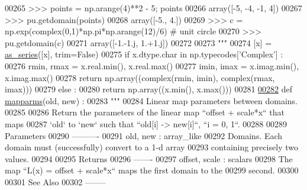 \begin{DoxyCode}
00265 \textcolor{stringliteral}{    >>> points = np.arange(4)**2 - 5; points}
00266 \textcolor{stringliteral}{    array([-5, -4, -1,  4])}
00267 \textcolor{stringliteral}{    >>> pu.getdomain(points)}
00268 \textcolor{stringliteral}{    array([-5.,  4.])}
00269 \textcolor{stringliteral}{    >>> c = np.exp(complex(0,1)*np.pi*np.arange(12)/6) # unit circle}
00270 \textcolor{stringliteral}{    >>> pu.getdomain(c)}
00271 \textcolor{stringliteral}{    array([-1.-1.j,  1.+1.j])}
00272 \textcolor{stringliteral}{}
00273 \textcolor{stringliteral}{    """}
00274     [x] = \hyperlink{namespacepyneb_1_1utils_1_1polyutils_a9c3751d438f0f75922155c7823fe2699}{as\_series}([x], trim=\textcolor{keyword}{False})
00275     \textcolor{keywordflow}{if} x.dtype.char \textcolor{keywordflow}{in} np.typecodes[\textcolor{stringliteral}{'Complex'}] :
00276         rmin, rmax = x.real.min(), x.real.max()
00277         imin, imax = x.imag.min(), x.imag.max()
00278         \textcolor{keywordflow}{return} np.array((complex(rmin, imin), complex(rmax, imax)))
00279     \textcolor{keywordflow}{else} :
00280         \textcolor{keywordflow}{return} np.array((x.min(), x.max()))
00281 
\hypertarget{polyutils_8py_source_l00282}{}\hyperlink{namespacepyneb_1_1utils_1_1polyutils_a3621b172891db0806163f72f22e3723b}{00282} \textcolor{keyword}{def }\hyperlink{namespacepyneb_1_1utils_1_1polyutils_a3621b172891db0806163f72f22e3723b}{mapparms}(old, new) :
00283     \textcolor{stringliteral}{"""}
00284 \textcolor{stringliteral}{    Linear map parameters between domains.}
00285 \textcolor{stringliteral}{}
00286 \textcolor{stringliteral}{    Return the parameters of the linear map ``offset + scale*x`` that maps}
00287 \textcolor{stringliteral}{    `old` to `new` such that ``old[i] -> new[i]``, ``i = 0, 1``.}
00288 \textcolor{stringliteral}{}
00289 \textcolor{stringliteral}{    Parameters}
00290 \textcolor{stringliteral}{    ----------}
00291 \textcolor{stringliteral}{    old, new : array\_like}
00292 \textcolor{stringliteral}{        Domains. Each domain must (successfully) convert to a 1-d array}
00293 \textcolor{stringliteral}{        containing precisely two values.}
00294 \textcolor{stringliteral}{}
00295 \textcolor{stringliteral}{    Returns}
00296 \textcolor{stringliteral}{    -------}
00297 \textcolor{stringliteral}{    offset, scale : scalars}
00298 \textcolor{stringliteral}{        The map ``L(x) = offset + scale*x`` maps the first domain to the}
00299 \textcolor{stringliteral}{        second.}
00300 \textcolor{stringliteral}{}
00301 \textcolor{stringliteral}{    See Also}
00302 \textcolor{stringliteral}{    --------}

\end{DoxyCode}
